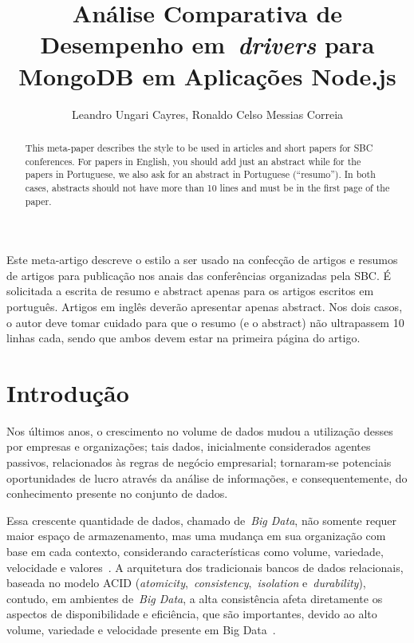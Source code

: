 \documentclass[12pt]{article}
\title{Análise Comparativa de Desempenho em~\emph{drivers} para MongoDB em Aplicações Node.js}
\author{Leandro Ungari Cayres, Ronaldo Celso Messias Correia }
\begin{document}
 

\maketitle

\begin{abstract}
  This meta-paper describes the style to be used in articles and short papers
  for SBC conferences. For papers in English, you should add just an abstract
  while for the papers in Portuguese, we also ask for an abstract in
  Portuguese (``resumo''). In both cases, abstracts should not have more than
  10 lines and must be in the first page of the paper.
\end{abstract}
     
\begin{resumo} 
  Este meta-artigo descreve o estilo a ser usado na confecção de artigos e
  resumos de artigos para publicação nos anais das conferências organizadas
  pela SBC. É solicitada a escrita de resumo e abstract apenas para os artigos
  escritos em português. Artigos em inglês deverão apresentar apenas abstract.
  Nos dois casos, o autor deve tomar cuidado para que o resumo (e o abstract)
  não ultrapassem 10 linhas cada, sendo que ambos devem estar na primeira
  página do artigo.
\end{resumo}


\section{Introdução}
Nos últimos anos, o crescimento no volume de dados mudou a utilização desses por empresas e organizações; tais dados, inicialmente considerados agentes passivos, relacionados às regras de negócio empresarial; tornaram-se potenciais oportunidades de lucro através da análise de informações, e consequentemente, do conhecimento presente no conjunto de dados.

Essa crescente quantidade de dados, chamado de~\emph{Big Data}, não somente requer maior espaço de armazenamento, mas uma mudança em sua organização com base em cada contexto, considerando características como volume, variedade, velocidade e valores~\cite{ward2013undefined}.
A arquitetura dos tradicionais bancos de dados relacionais, baseada no modelo ACID (\textit{atomicity},~\textit{consistency},~\textit{isolation} e~\textit{durability}), contudo, em ambientes de~\emph{Big Data}, a alta consistência afeta diretamente os aspectos de disponibilidade e  eficiência, que são importantes, devido ao alto volume, variedade e velocidade presente em Big Data~\cite{aparicio:2016}. 
\end{document}
